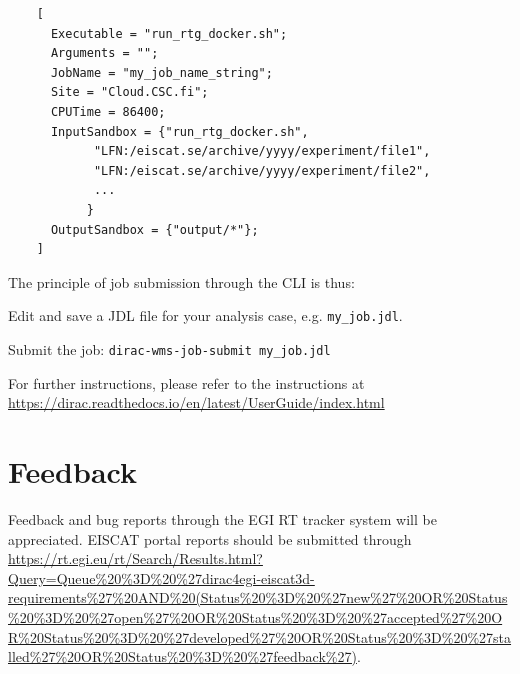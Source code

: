\documentclass[a4paper]{article}
\begin{document}
\begin{verbatim}
    [
      Executable = "run_rtg_docker.sh";
      Arguments = "";
      JobName = "my_job_name_string";
      Site = "Cloud.CSC.fi";
      CPUTime = 86400;
      InputSandbox = {"run_rtg_docker.sh",
            "LFN:/eiscat.se/archive/yyyy/experiment/file1",
            "LFN:/eiscat.se/archive/yyyy/experiment/file2",
            ...
           }
      OutputSandbox = {"output/*"};
    ]  
\end{verbatim}

The principle of job submission through the CLI is thus:

\begin{description}
\item Edit and save a JDL file for your analysis case, e.g. \verb+my_job.jdl+.
  
\item Submit the job: \verb+dirac-wms-job-submit my_job.jdl+

\end{description}

For further instructions, please refer to the instructions at
\url{https://dirac.readthedocs.io/en/latest/UserGuide/index.html}

\section{Feedback}
\label{sec:feedback}
Feedback and bug reports through the EGI RT tracker system will be appreciated. EISCAT portal reports should be submitted through
 \url{https://rt.egi.eu/rt/Search/Results.html?Query=Queue\%20\%3D\%20\%27dirac4egi-eiscat3d-requirements\%27\%20AND\%20(Status\%20\%3D\%20\%27new\%27\%20OR\%20Status\%20\%3D\%20\%27open\%27\%20OR\%20Status\%20\%3D\%20\%27accepted\%27\%20OR\%20Status\%20\%3D\%20\%27developed\%27\%20OR\%20Status\%20\%3D\%20\%27stalled\%27\%20OR\%20Status\%20\%3D\%20\%27feedback\%27)}.
\end{document}
